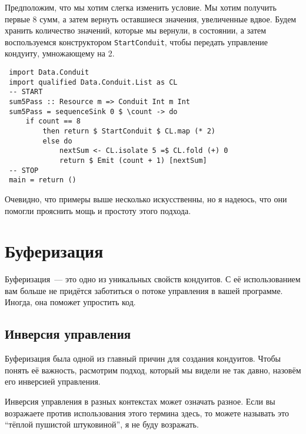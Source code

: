 Предположим, что мы хотим слегка изменить условие. Мы хотим получить первые 8 сумм, а 
затем вернуть оставшиеся значения, увеличенные вдвое. Будем хранить количество значений, которые
мы вернули, в состоянии, а затем воспользуемся конструктором 
\lstinline'StartConduit', чтобы передать управление кондуиту, умножающему на 2.
\begin{lstlisting}
 import Data.Conduit
 import qualified Data.Conduit.List as CL
 -- START
 sum5Pass :: Resource m => Conduit Int m Int
 sum5Pass = sequenceSink 0 $ \count -> do
     if count == 8
         then return $ StartConduit $ CL.map (* 2)
         else do
             nextSum <- CL.isolate 5 =$ CL.fold (+) 0
             return $ Emit (count + 1) [nextSum]
 -- STOP
 main = return ()
\end{lstlisting}
Очевидно, что примеры выше несколько искусственны, но я надеюсь, что они
помогли прояснить мощь и простоту этого подхода. 
 
\section{Буферизация}

Буферизация~--- это одно из уникальных свойств кондуитов. С её использованием 
вам больше не придётся заботиться о потоке управления в вашей программе.
Иногда, она поможет упростить код.

\subsection{Инверсия управления}

Буферизация была одной из главный причин для создания кондуитов. Чтобы понять её 
важность, расмотрим подход, который мы видели не так давно, назовём его
инверсией управления.

\begin{remark}
Инверсия управления в разных контекстах может означать разное. Если вы возражаете 
против использования этого термина здесь, то можете называть это 
``тёплой пушистой штуковиной'', я не буду возражать.
\end{remark}


